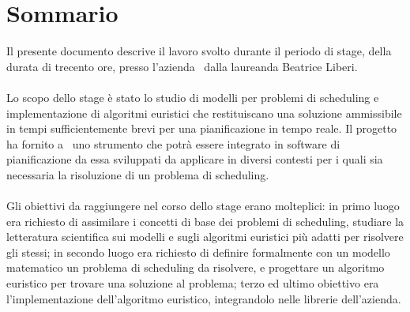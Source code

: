 
\cleardoublepage
{}
{}
\begingroup
\let\clearpage\relax
\let\cleardoublepage\relax
\let\cleardoublepage\relax

\chapter*{Sommario}

Il presente documento descrive il lavoro svolto durante il periodo di stage, della durata di trecento ore, presso l'azienda \TS\ dalla laureanda Beatrice Liberi. \\ \\
Lo scopo dello stage è stato lo studio di modelli per problemi di scheduling e implementazione di algoritmi euristici che restituiscano una soluzione ammissibile in tempi sufficientemente brevi per una pianificazione in tempo reale. Il progetto ha fornito a \TS\ uno strumento che potrà essere integrato in software di pianificazione da essa sviluppati da applicare in diversi contesti per i quali sia necessaria la risoluzione di un problema di scheduling. \\ \\
Gli obiettivi da raggiungere nel corso dello stage erano molteplici: 
in primo luogo era richiesto di assimilare i concetti di base dei problemi di scheduling, studiare la letteratura scientifica sui modelli e sugli algoritmi euristici più adatti per risolvere gli stessi; in secondo luogo era richiesto di definire formalmente con un modello matematico un problema di scheduling da risolvere, e progettare un algoritmo euristico per trovare una soluzione al problema; terzo ed ultimo obiettivo era l'implementazione dell'algoritmo euristico, integrandolo nelle librerie dell'azienda.

\endgroup			

\vfill

